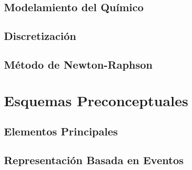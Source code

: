 \subsection{Modelamiento del Químico}
%
\subsection{Discretización}

\subsection{Método de Newton-Raphson}
%

\section{Esquemas Preconceptuales}

\subsection{Elementos Principales}

\subsection{Representación Basada en Eventos}